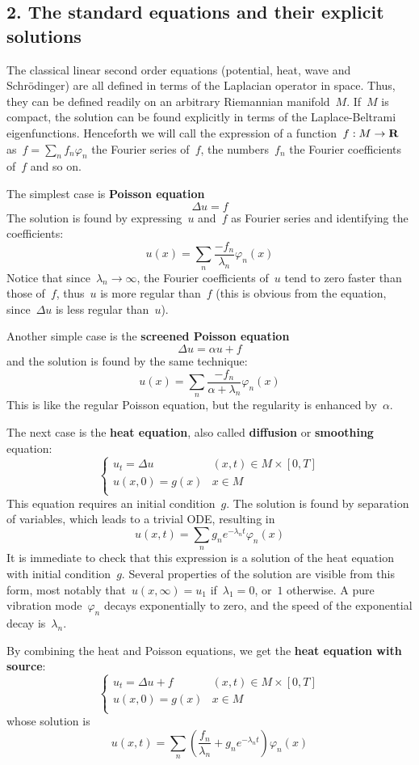 \subsection{2. The standard equations and their explicit solutions}

The classical linear second order equations (potential, heat, wave and
Schrödinger) are all defined in terms of the Laplacian operator in space.
Thus, they can be defined readily on an arbitrary Riemannian manifold~$M$.
If~$M$ is compact, the solution can be found explicitly in terms of the
Laplace-Beltrami eigenfunctions.  Henceforth we will call the expression of a
function~$f:M\to\mathbf{R}$ as~$f=\sum_nf_n\varphi_n$ the Fourier series of~$f$, the
numbers~$f_n$ the Fourier coefficients of~$f$ and so on.

The simplest case is {\bf Poisson equation}
$$
	\Delta u = f
$$
The solution is found by expressing~$u$ and~$f$ as Fourier series and
identifying the coefficients:
$$
u(x) = \sum_n\frac{-f_n}{\lambda_n}\varphi_n(x)
$$
Notice that since~$\lambda_n\to\infty$, the Fourier coefficients of~$u$ tend
to zero faster than those of~$f$, thus~$u$ is more regular than~$f$
(this is obvious from the equation, since~$\Delta u$ is less regular than~$u$).

Another simple case is the {\bf screened Poisson equation}
$$
\Delta u = \alpha u + f
$$
and the solution is found by the same technique:
$$
u(x) = \sum_n\frac{-f_n}{\alpha+\lambda_n}\varphi_n(x)
$$
This is like the regular Poisson equation, but the regularity is enhanced
by~$\alpha$.

The next case is the {\bf heat equation}, also called {\bf diffusion} or {\bf
smoothing} equation:
$$
\begin{cases}
	u_t = \Delta u & (x,t)\in M\times[0,T] \\
	u(x,0)=g(x) & x\in M\\
\end{cases}
$$
This equation requires an initial condition~$g$.  The solution is found by
separation of variables, which leads to a trivial ODE, resulting in
$$
u(x,t)=\sum_ng_ne^{-{\lambda_n}t}\varphi_n(x)
$$
It is immediate to check that this expression is a solution of the heat
equation with initial condition~$g$.  Several properties of the solution are
visible from this form, most notably that~$u(x,\infty)=u_1$ if~$\lambda_1=0$,
or~$1$ otherwise.  A pure vibration mode~$\varphi_n$ decays exponentially to
zero, and the speed of the exponential decay is~$\lambda_n$.

By combining the heat and Poisson equations, we get the {\bf heat equation
with source}:
$$
\begin{cases}
	u_t = \Delta u + f & (x,t)\in M\times[0,T] \\
	u(x,0)=g(x) & x\in M\\
\end{cases}
$$
whose solution is
$$
u(x,t)=\sum_n\left(
\frac{f_n}{\lambda_n}+g_ne^{-{\lambda_n}t}
\right)\varphi_n(x)
$$

